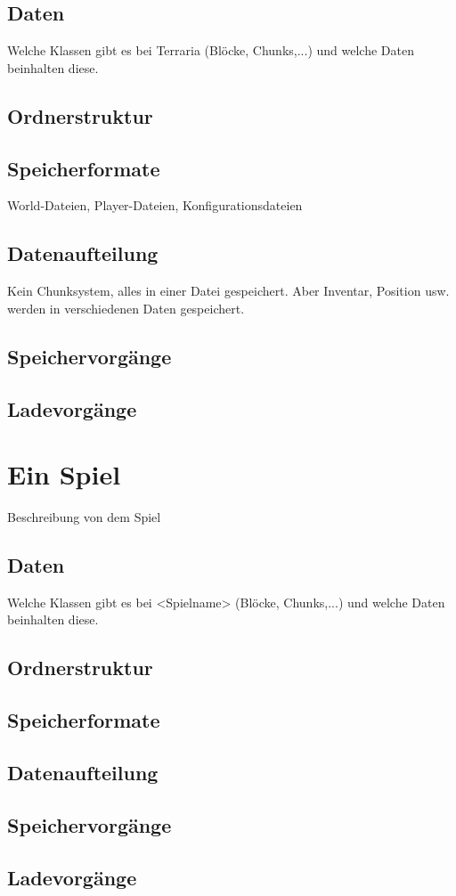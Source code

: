 \subsection{Daten}
Welche Klassen gibt es bei Terraria (Blöcke, Chunks,...) und welche Daten 
beinhalten diese.

\subsection{Ordnerstruktur}

\subsection{Speicherformate}
World-Dateien, Player-Dateien, Konfigurationsdateien 

\subsection{Datenaufteilung}
Kein Chunksystem, alles in einer Datei gespeichert. Aber Inventar, Position
usw. werden in verschiedenen Daten gespeichert.

\subsection{Speichervorgänge}

\subsection{Ladevorgänge}


\section{Ein Spiel}
Beschreibung von dem Spiel

\subsection{Daten}
Welche Klassen gibt es bei <Spielname> (Blöcke, Chunks,...) und welche Daten 
beinhalten diese.

\subsection{Ordnerstruktur}

\subsection{Speicherformate}

\subsection{Datenaufteilung}

\subsection{Speichervorgänge}

\subsection{Ladevorgänge}
\fi
